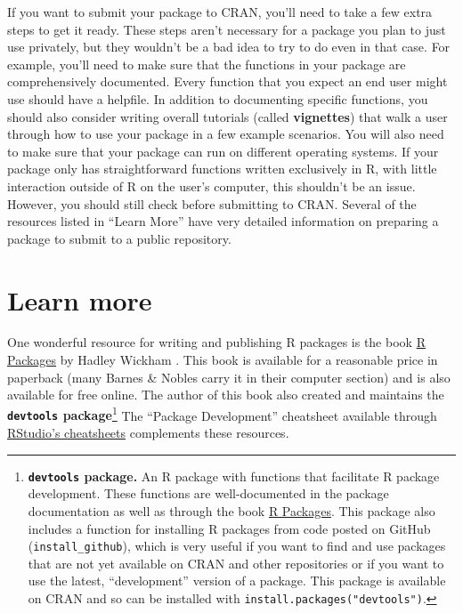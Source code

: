 \documentclass[]{tufte-book}
\begin{document}
If you want to submit your package to CRAN, you'll need to take a few extra
steps to get it ready. These steps aren't necessary for a package you plan to
just use privately, but they wouldn't be a bad idea to try to do even in that
case. For example, you'll need to make sure that the functions in your package
are comprehensively documented. Every function that you expect an end user might
use should have a helpfile. In addition to documenting specific functions, you
should also consider writing overall tutorials (called \textbf{vignettes}) that walk
a user through how to use your package in a few example scenarios. You will also
need to make sure that your package can run on different operating systems. If
your package only has straightforward functions written exclusively in R, with
little interaction outside of R on the user's computer, this shouldn't be an
issue. However, you should still check before submitting to CRAN. Several of the
resources listed in ``Learn More'' have very detailed information on preparing a
package to submit to a public repository.

\hypertarget{learn-more-1}{%
\section{Learn more}\label{learn-more-1}}

One wonderful resource for writing and publishing R packages is the book \href{http://r-pkgs.had.co.nz/}{R
Packages} by Hadley Wickham \citep{wickham2015r}. This book
is available for a reasonable price in paperback (many Barnes \& Nobles carry it
in their computer section) and is also available for free online. The author of
this book also created and maintains the \textbf{\texttt{devtools} package}\footnote{\textbf{\texttt{devtools}
  package.} An R package with functions that facilitate R package development.
  These functions are well-documented in the package documentation as well as
  through the book \href{http://r-pkgs.had.co.nz/}{R Packages}. This package also
  includes a function for installing R packages from code posted on GitHub
  (\texttt{install\_github}), which is very useful if you want to find and use packages
  that are not yet available on CRAN and other repositories or if you want to use
  the latest, ``development'' version of a package. This package is available on
  CRAN and so can be installed with \texttt{install.packages("devtools")}.} The ``Package
Development'' cheatsheet available through \href{https://www.rstudio.com/resources/cheatsheets/}{RStudio's
cheatsheets} complements these
resources.
\end{document}

